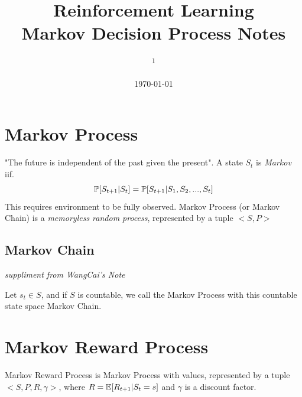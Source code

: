 \documentclass[10pt, a4paper, twocolumn]{article} %
\title{Reinforcement Learning \\ Markov Decision Process Notes} %
\author{
	\authorstyle{Lu Hong \textsuperscript{1}}
	\newline\newline %
	\textsuperscript{1}\institution{Nanjing University of Aeronautics and Astronautics}\\ %
}
\date{\today} %
\begin{document}
\maketitle %

\thispagestyle{firstpage} %





\section{Markov Process}
"The future is independent of the past given the present". A state $S_{t}$ is \textsl{Markov} iif.  $$ \Bbb{P} [S_{t+1} | S_{t} ] = \Bbb{P} [ S_{t+1} | S_{1}, S_{2}, ..., S_{t} ] $$
This requires environment to be fully observed.
Markov Process (or Markov Chain) is a \textit{memoryless random process}, represented by a tuple $<S,P>$

\subsection{Markov Chain}
\textsl{suppliment from WangCai's Note}

Let $s_{t} \in S$, and if $S$ is countable, we call the Markov Process with this countable state space Markov Chain.



\section{Markov Reward Process}
Markov Reward Process is Markov Process with values, represented by a tuple $<S,P,R,\gamma>$, where $R = \Bbb{E}[R_{t+1} | S_{t} = s]$  and $\gamma$ is a discount factor.
\end{document}
